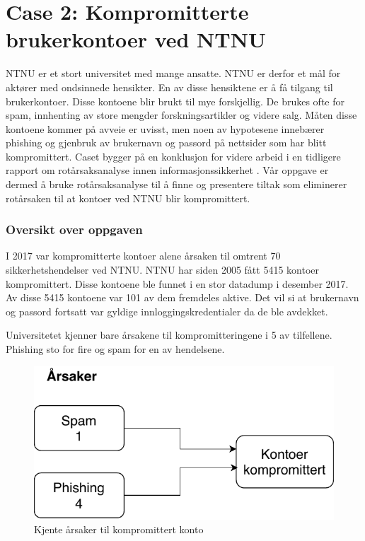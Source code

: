 \section{Case 2: Kompromitterte brukerkontoer ved NTNU}
\label{sec:case_kontoer}
NTNU er et stort universitet med mange ansatte. NTNU er derfor et mål for aktører med ondsinnede hensikter. En av disse hensiktene er å få tilgang til brukerkontoer. Disse kontoene blir brukt til mye forskjellig. De brukes ofte for spam, innhenting av store mengder forskningsartikler og videre salg. Måten disse kontoene kommer på avveie er uvisst, men noen av hypotesene innebærer phishing og gjenbruk av brukernavn og passord på nettsider som har blitt kompromittert. Caset bygger på en konklusjon for videre arbeid i en tidligere rapport om rotårsaksanalyse innen informasjonssikkerhet \cite{Hellesen:1}. Vår oppgave er dermed å bruke rotårsaksanalyse til å finne og presentere tiltak som eliminerer rotårsaken til at kontoer ved NTNU blir kompromittert. 

\subsubsection{Oversikt over oppgaven}
I 2017 var kompromitterte kontoer alene årsaken til omtrent 70 sikkerhetshendelser ved NTNU. NTNU har siden 2005 fått 5415 kontoer kompromittert. Disse kontoene ble funnet i en stor datadump i desember 2017. Av disse 5415 kontoene var 101 av dem fremdeles aktive. Det vil si at brukernavn og passord fortsatt var gyldige innloggingskredentialer da de ble avdekket. 

Universitetet kjenner bare årsakene til kompromitteringene i 5 av tilfellene. Phishing sto for fire og spam for en av hendelsene. 

\begin{figure}[H]
    \centering
    \includegraphics[scale=0.6]{case_2/bilder/kjente_arsaker.pdf}
    \caption[Kjente årsaker til kompromittert konto]{Kjente årsaker til kompromittert konto}
    \label{fig:kjente-arsaker-kompromittert-konto}
\end{figure}

